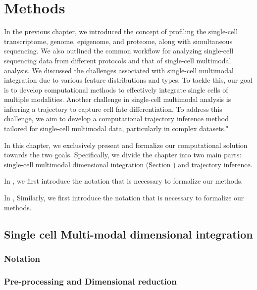 
\chapter{Methods}
\label{chapter:methods}
\graphicspath{{chapter3/figs}}

In the previous chapter, we introduced the concept of profiling the single-cell transcriptome, genome, epigenome, and proteome, along with simultaneous sequencing. We also outlined the common workflow for analyzing single-cell sequencing data from different protocols and that of single-cell multimodal analysis. We discussed the challenges associated with single-cell multimodal integration due to various feature distributions and types. To tackle this, our goal is to develop computational methods to effectively integrate single cells of multiple modalities. Another challenge in single-cell multimodal analysis is inferring a trajectory to capture cell fate differentiation. To address this challenge, we aim to develop a computational trajectory inference method tailored for single-cell multimodal data, particularly in complex datasets."

In this chapter, we exclusively present and formalize our computational solution towards the two goals. Specifically, we divide the chapter into two main parts: single-cell multimodal dimensional integration (Section ) and trajectory inference.

In , we first introduce the notation that is necessary to formalize our methods.

In , Similarly, we first introduce the notation that is necessary to formalize our methods.


\section{Single cell Multi-modal dimensional integration}
\label{methods:integration}
\subsection{Notation}

\subsection{Pre-processing and Dimensional reduction}


